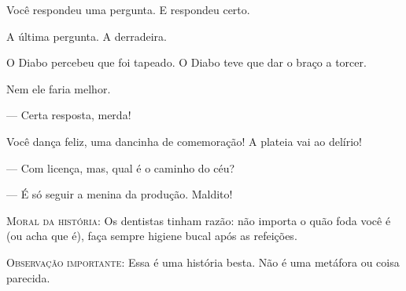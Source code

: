 Você respondeu uma pergunta. E respondeu certo.

A última pergunta. A derradeira.

O Diabo percebeu que foi tapeado. O Diabo teve que dar o braço a torcer.

Nem ele faria melhor.

--- Certa resposta, merda!

Você dança feliz, uma dancinha de comemoração! A plateia vai ao delírio!

--- Com licença, mas, qual é o caminho do céu?

--- É só seguir a menina da produção. Maldito!

	\begin{center}
	\textsc{Moral da história}: Os dentistas tinham razão: não importa o quão foda você é (ou acha que é), faça sempre higiene bucal após as refeições.

	\textsc{Observação importante}: Essa é uma história besta. Não é uma metáfora ou coisa parecida.
	\end{center}
